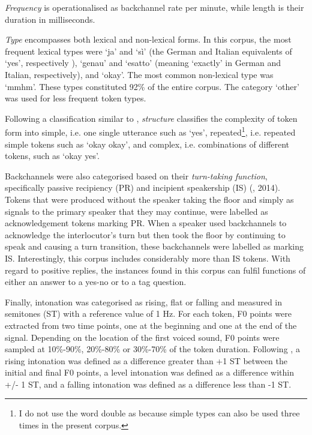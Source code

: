 \textit{Frequency} is operationalised as backchannel rate per minute, while length is their duration in milliseconds.

\textit{Type} encompasses both lexical and non-lexical forms. In this corpus, the most frequent lexical types were ‘ja’ and ‘sì’ (the German and Italian equivalents of ‘yes’, respectively ), ‘genau’ and ‘esatto’ (meaning ‘exactly’ in German and Italian, respectively), and ‘okay’. The most common non-lexical type was ‘mmhm’. These types constituted 92\% of the entire corpus. The category ‘other’ was used for less frequent token types.

Following a classification similar to \citet{Tottie1991}, \textit{structure} classifies the complexity of token form into simple, i.e. one single utterance such as ‘yes’, repeated\footnote{I do not use the word double as \citet{Tottie1991} because simple types can also be used three times in the present corpus.}, i.e. repeated simple tokens such as ‘okay okay’, and complex, i.e. combinations of different tokens, such as ‘okay yes’.

Backchannels were also categorised based on their \textit{turn-taking function}, specifically passive recipiency (PR) and incipient speakership (IS) (\citealt{Savino2010,Savino2011}, 2014). Tokens that were produced without the speaker taking the floor and simply as signals to the primary speaker that they may continue, were labelled as acknowledgement tokens marking PR. When a speaker used backchannels to acknowledge the interlocutor’s turn but then took the floor by continuing to speak and causing a turn transition, these backchannels were labelled as marking IS. Interestingly, this corpus includes considerably more \citet{PR1376} than IS  tokens. With regard to positive replies, the instances found in this corpus can fulfil functions of either an answer to a yes-no or to a tag question.

Finally, intonation was categorised as rising, flat or falling and measured in semitones (ST) with a reference value of 1 Hz. For each token, F0 points were extracted from two time points, one at the beginning and one at the end of the signal. Depending on the location of the first voiced sound, F0 points were sampled at 10\%-90\%, 20\%-80\% or 30\%-70\% of the token duration. Following \citep{Wehrle2022}, a rising intonation was defined as a difference greater than +1 ST between the initial and final F0 points, a level intonation was defined as a difference within +/- 1 ST, and a falling intonation was defined as a difference less than -1 ST.

